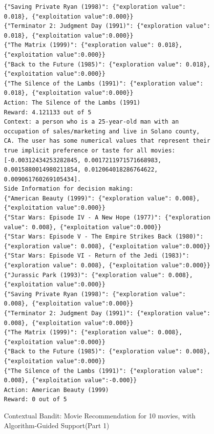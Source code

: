 \documentclass[11pt, logo]{googledeepmind}
\newcommand{\ag}{Algorithm-Guided Support\xspace}
\theoremstyle{plain}
\theoremstyle{definition}
\begin{document}
\begin{figure}[ht]
\begin{lstlisting}[escapechar=!]
{"Saving Private Ryan (1998)": {"exploration value": 0.018}, {"exploitation value":0.000}}
{"Terminator 2: Judgment Day (1991)": {"exploration value": 0.018}, {"exploitation value":0.000}}
{"The Matrix (1999)": {"exploration value": 0.018}, {"exploitation value":0.000}}
{"Back to the Future (1985)": {"exploration value": 0.018}, {"exploitation value":0.000}}
{"The Silence of the Lambs (1991)": {"exploration value": 0.018}, {"exploitation value":0.000}}
Action: The Silence of the Lambs (1991)
Reward: 4.121133 out of 5
Context: a person who is a 25-year-old man with an occupation of sales/marketing and live in Solano county, CA. The user has some numerical values that represent their true implicit preference or taste for all movies: [-0.00312434253282845, 0.0017211971571668983, 0.0015880014980211854, 0.012064018286764622, 0.009061760269105434].
Side Information for decision making:
{"American Beauty (1999)": {"exploration value": 0.008}, {"exploitation value":0.000}}
{"Star Wars: Episode IV - A New Hope (1977)": {"exploration value": 0.008}, {"exploitation value":0.000}}
{"Star Wars: Episode V - The Empire Strikes Back (1980)": {"exploration value": 0.008}, {"exploitation value":0.000}}
{"Star Wars: Episode VI - Return of the Jedi (1983)": {"exploration value": 0.008}, {"exploitation value":0.000}}
{"Jurassic Park (1993)": {"exploration value": 0.008}, {"exploitation value":0.000}}
{"Saving Private Ryan (1998)": {"exploration value": 0.008}, {"exploitation value":0.000}}
{"Terminator 2: Judgment Day (1991)": {"exploration value": 0.008}, {"exploitation value":0.000}}
{"The Matrix (1999)": {"exploration value": 0.008}, {"exploitation value":0.000}}
{"Back to the Future (1985)": {"exploration value": 0.008}, {"exploitation value":0.000}}
{"The Silence of the Lambs (1991)": {"exploration value": 0.008}, {"exploitation value":-0.000}}
Action: American Beauty (1999)
Reward: 0 out of 5
    \end{lstlisting}
    \caption{Contextual Bandit: Movie Recommendation for 10 movies, with \ag (Part 1)}
    \label{fig:cb_movie_10_rh_ag_part1}
\end{figure}
\end{document}
